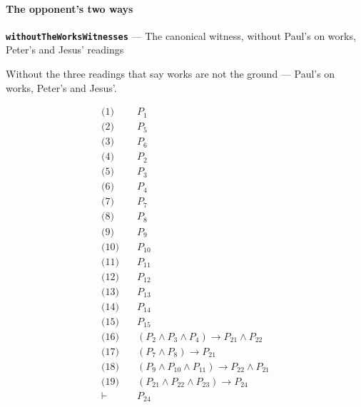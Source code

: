 \documentclass[11pt]{article}
\begin{document}
\paragraph*{The opponent's two ways}
\leavevmode\par
\par\medskip\noindent\textbf{\texttt{without\allowbreak{}The\allowbreak{}Works\allowbreak{}Witnesses}} --- The canonical witness, without Paul's on works, Peter's and Jesus' readings\par\nobreak\noindent
Without the three readings that say works are not the ground — Paul's on works, Peter's and Jesus'.

\begin{align*}
  \text{(1)} \quad & P_{1} \\
  \text{(2)} \quad & P_{5} \\
  \text{(3)} \quad & P_{6} \\
  \text{(4)} \quad & P_{2} \\
  \text{(5)} \quad & P_{3} \\
  \text{(6)} \quad & P_{4} \\
  \text{(7)} \quad & P_{7} \\
  \text{(8)} \quad & P_{8} \\
  \text{(9)} \quad & P_{9} \\
  \text{(10)} \quad & P_{10} \\
  \text{(11)} \quad & P_{11} \\
  \text{(12)} \quad & P_{12} \\
  \text{(13)} \quad & P_{13} \\
  \text{(14)} \quad & P_{14} \\
  \text{(15)} \quad & P_{15} \\
  \text{(16)} \quad & (P_{2} \land P_{3} \land P_{4}) \rightarrow P_{21} \land P_{22} \\
  \text{(17)} \quad & (P_{7} \land P_{8}) \rightarrow P_{21} \\
  \text{(18)} \quad & (P_{9} \land P_{10} \land P_{11}) \rightarrow P_{22} \land P_{21} \\
  \text{(19)} \quad & (P_{21} \land P_{22} \land P_{23}) \rightarrow P_{24} \\
  \vdash \quad & P_{24}
\end{align*}
\end{document}
